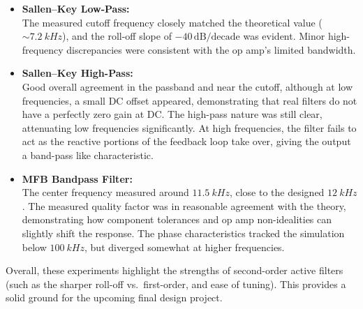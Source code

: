 \documentclass[12pt]{article}
\begin{document}
\begin{itemize}

\item \textbf{Sallen--Key Low-Pass:}\\
The measured cutoff frequency closely matched the theoretical value
($\sim\SI{7.2}{kHz}$), and the roll-off slope of $-40\,\mathrm{dB/decade}$ was
evident. Minor high-frequency discrepancies were consistent with the op amp’s
limited bandwidth.

\item \textbf{Sallen--Key High-Pass:}\\
Good overall agreement in the passband and near the cutoff, although
at low frequencies, a small DC offset appeared, demonstrating that real filters
do not have a perfectly zero gain at DC. The high-pass nature was still clear,
attenuating low frequencies significantly. At high frequencies, the filter fails
to act as the reactive portions of the feedback loop take over, giving the
output a band-pass like characteristic.

\item \textbf{MFB Bandpass Filter:}\\
The center frequency measured around $\SI{11.5}{kHz}$, close to the designed
$\SI{12}{kHz}$. The measured quality factor was in reasonable agreement with the
theory, demonstrating how component tolerances and op amp non-idealities can
slightly shift the response. The phase characteristics tracked the simulation
below $\SI{100}{kHz}$, but diverged somewhat at higher frequencies.
\end{itemize}

Overall, these experiments highlight the strengths of second-order active
filters (such as the sharper roll-off vs.\ first-order, and ease of tuning).
This provides a solid ground for the upcoming final design project.
\end{document}
